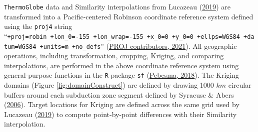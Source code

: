 \texttt{ThermoGlobe} data and Similarity interpolations from Lucazeau (\protect\hyperlink{ref-lucazeau2019}{2019}) are transformed into a Pacific-centered Robinson coordinate reference system defined using the \texttt{proj4} string ``\texttt{+proj=robin\ +lon\_0=-155\ +lon\_wrap=-155\ +x\_0=0\ +y\_0=0\ +ellps=WGS84\ +datum=WGS84\ +units=m\ +no\_defs}'' (\protect\hyperlink{ref-proj2021}{PROJ contributors, 2021}). All geographic operations, including transformation, cropping, Kriging, and comparing interpolations, are performed in the above coordinate reference system using general-purpose functions in the \texttt{R} package \texttt{sf} (\protect\hyperlink{ref-pebesma2018}{Pebesma, 2018}). The Kriging domains (Figure \ref{fig:domainConstruct}) are defined by drawing 1000 \(km\) circular buffers around each subduction zone segment defined by Syracuse \& Abers (\protect\hyperlink{ref-syracuse2006}{2006}). Target locations for Kriging are defined across the same grid used by Lucazeau (\protect\hyperlink{ref-lucazeau2019}{2019}) to compute point-by-point differences with their Similarity interpolation.



